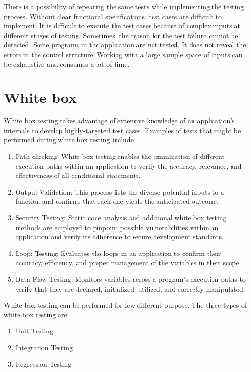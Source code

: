 \documentclass{article}
\begin{document}
There is a possibility of repeating the same tests while implementing the testing process.
Without clear functional specifications, test cases are difficult to implement.
It is difficult to execute the test cases because of complex inputs at different stages of testing.
Sometimes, the reason for the test failure cannot be detected.
Some programs in the application are not tested.
It does not reveal the errors in the control structure.
Working with a large sample space of inputs can be exhaustive and consumes a lot of time.

\section{White box}
White box testing takes advantage of extensive knowledge of an application's internals to develop highly-targeted test cases. Examples of tests that might be performed during white box testing include

\begin{enumerate}
	\item Path checking: White box testing enables the examination of different execution paths within an application to verify the accuracy, relevance, and effectiveness of all conditional statements.
	\item Output Validation: This process lists the diverse potential inputs to a function and confirms that each one yields the anticipated outcome.
	\item Security Testing: Static code analysis and additional white box testing methods are employed to pinpoint possible vulnerabilities within an application and verify its adherence to secure development standards.
	\item Loop: Testing: Evaluates the loops in an application to confirm their accuracy, efficiency, and proper management of the variables in their scope 
	\item Data Flow Testing: Monitors variables across a program's execution paths to verify that they are declared, initialized, utilized, and correctly manipulated.
\end{enumerate}

White box testing can be performed for few different purpose. The three types of white box testing are:
\begin{enumerate}
	\item Unit Testing
	\item Integration Testing
	\item Regression Testing
\end{enumerate}
\end{document}
